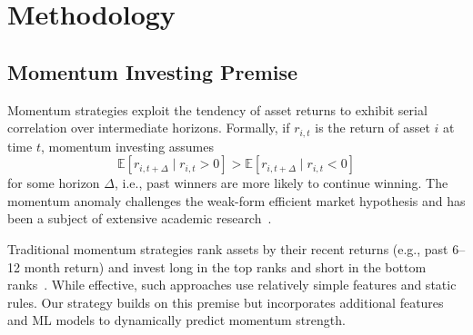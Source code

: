 \documentclass[conference]{IEEEtran}
\begin{document}
\section{Methodology}\label{sec:method}

\subsection{Momentum Investing Premise}
Momentum strategies exploit the tendency of asset returns to exhibit serial correlation over intermediate horizons. Formally, if $r_{i,t}$ is the return of asset $i$ at time $t$, momentum investing assumes
\[ \mathbb{E}[r_{i,t+\Delta} \mid r_{i,t} > 0] > \mathbb{E}[r_{i,t+\Delta} \mid r_{i,t} < 0] \]
for some horizon $\Delta$, i.e., past winners are more likely to continue winning. The momentum anomaly challenges the weak-form efficient market hypothesis and has been a subject of extensive academic research~\cite{jegadeesh1993,carhart1997,asness2013}.

Traditional momentum strategies rank assets by their recent returns (e.g., past 6--12 month return) and invest long in the top ranks and short in the bottom ranks~\cite{jegadeesh1993,carhart1997}. While effective, such approaches use relatively simple features and static rules. Our strategy builds on this premise but incorporates additional features and ML models to dynamically predict momentum strength.
\end{document}
